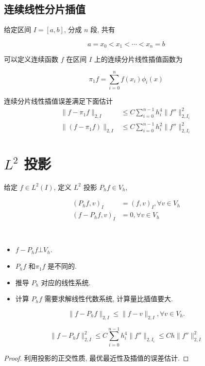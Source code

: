 \documentclass{article}
\begin{document}
\subsection{连续线性分片插值}

给定区间 $I=[a, b]$, 分成 $n$ 段, 共有 

$$
a = x_0 < x_1 < \cdots < x_n=b
$$

可以定义连续函数 $f$ 在区间 $I$ 上的连续分片线性插值函数为

$$
\pi_1 f = \sum_{i=0}^n f(x_i) \phi_i(x)
$$

\begin{framed}
    \begin{proposition}
        连续分片线性插值误差满足下面估计
        \begin{align*}
            \|f- \pi_1 f\|_{2,I} &\leq C \sum_{i=0}^{n-1} h_i^4 \|f''\|_{2,
            I_i}^2 \\
            \|(f - \pi_1 f)\|_{2, I} &\leq C \sum_{i=0}^{n-1}h_i^2 \|f''\|_{2,
            I_i}^2
        \end{align*}
    \end{proposition}
\end{framed}

\section{$L^2$ 投影}

给定 $f\in L^2(I)$, 定义 $L^2$ 投影 $P_h f \in V_h$, 

\begin{align*}
    (P_h f, v)_I &= (f, v)_I, \forall v\in V_h\\
    (f - P_h f, v)_I &= 0, \forall v\in V_h
\end{align*}

\begin{framed}
\begin{remark}
 ~   
\begin{itemize}
    \item $f - P_h f \bot V_h$.
    \item $P_h f$ 和$\pi_1 f$ 是不同的.
    \item 推导 $P_h$ 对应的线性系统.
    \item 计算 $P_h f$ 需要求解线性代数系统, 计算量比插值要大.
\end{itemize}
\end{remark}
\end{framed}

\begin{framed}
    \begin{theorem}
        $$
        \|f-P_hf\|_{2, I} \leq \|f - v\|_{2, I}, \forall v \in V_h.
        $$
    \end{theorem}
    \begin{theorem}
        $$
        \|f- P_h f\|_{2,I}^2 \leq C \sum_{i=0}^{n-1} h_i^4 \|f''\|_{2, I_i}
        \leq C h \|f''\|_{2, I}^2
        $$
    \end{theorem}
    \begin{proof}
        利用投影的正交性质, 最优最近性及插值的误差估计.
    \end{proof}
\end{framed}
\end{document}
